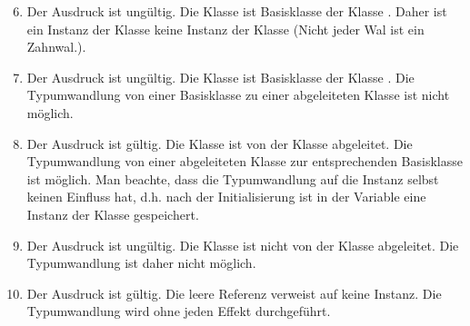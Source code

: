 \begin{frame}[t]%
\begin{solution}

\begin{enumerate}
\setcounter{enumi}{5}
\item
  Der Ausdruck ist ung\"ultig.
  Die Klasse  ist Basisklasse der Klasse .
  Daher ist ein Instanz der Klasse  keine Instanz der Klasse  (\glqq Nicht jeder Wal ist ein Zahnwal.\grqq).
\item
  Der Ausdruck ist ung\"ultig.
  Die Klasse  ist Basisklasse der Klasse .
  Die Typumwandlung von einer Basisklasse zu einer abgeleiteten Klasse ist nicht m\"oglich.
\item
  Der Ausdruck ist g\"ultig.
  Die Klasse  ist von der Klasse  abgeleitet.
  Die Typumwandlung von einer abgeleiteten Klasse zur entsprechenden Basisklasse ist m\"oglich.
  Man beachte, dass die Typumwandlung auf die Instanz selbst keinen Einfluss hat, d.h{.} nach der Initialisierung ist in der Variable  eine Instanz der Klasse  gespeichert.
\item
  Der Ausdruck ist ung\"ultig.
  Die Klasse  ist nicht von der Klasse  abgeleitet.
  Die Typumwandlung ist daher nicht m\"oglich.
\item
  Der Ausdruck ist g\"ultig. Die leere Referenz  verweist auf keine Instanz.
  Die Typumwandlung wird ohne jeden Effekt durchgef\"uhrt.
\end{enumerate}
\end{solution}
\end{frame}
